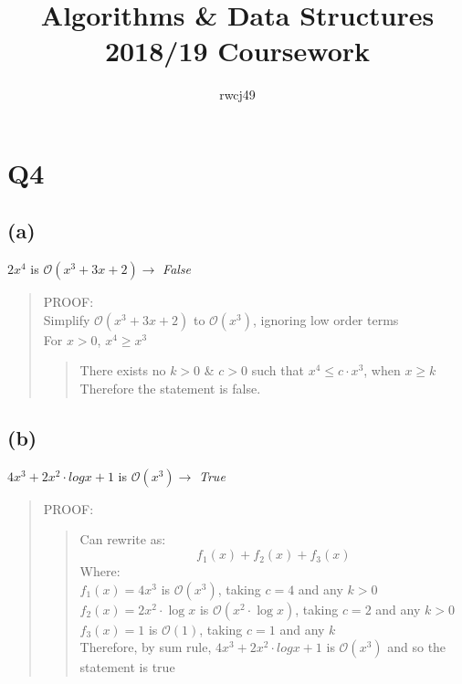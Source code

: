 \documentclass[12pt]{article}%
\title{Algorithms & Data Structures 2018/19 Coursework}
\author{rwcj49}
\date{  }
\begin{document}
\maketitle


\section*{Q4}
\subsection*{(a)}
$2x^4$ is $\mathcal{O}(x^3 + 3x +2) \xrightarrow{}$ \textit{False} \\
\begin{quote}
PROOF:\\

\skip
Simplify $\mathcal{O}(x^3 + 3x +2)$ to  $\mathcal{O}(x^3)$, ignoring low order terms\\

For $x > 0$,\hspace{10px} $x^4 \geq  x^3$
\begin{quote}
There exists no $k>0$ \& $c >0 $ such that $x^4 \leq c \cdot x^3$, when $x \geq k$ \\
Therefore the statement is false.

\end{quote}
\end{quote}




\subsection*{(b)}
$4x^3 +2x^2 \cdot logx + 1$ is $\mathcal{O}(x^3) \xrightarrow{}$ \textit{True} \\
\begin{quote}
PROOF:
\begin{quote}
Can rewrite as:
    $$f_1(x) + f_2(x) + f_3(x)$$
    Where:\\
    $f_1(x) = 4x^3$ is $\mathcal{O}(x^3)$, taking $c = 4$ and any $k > 0$\\
    $f_2(x) = 2x^2 \cdot \log x$ is $\mathcal{O}(x^2\cdot \log x)$, taking $c = 2$ and any $k > 0$\\
    $f_3(x) = 1$ is $\mathcal{O}(1)$, taking $c = 1$ and any $k$\\
    Therefore, by sum rule, $4x^3 +2x^2 \cdot logx + 1$ is $\mathcal{O}(x^3)$ and so the statement is true\\
\end{quote}
\end{quote}
\end{document}
